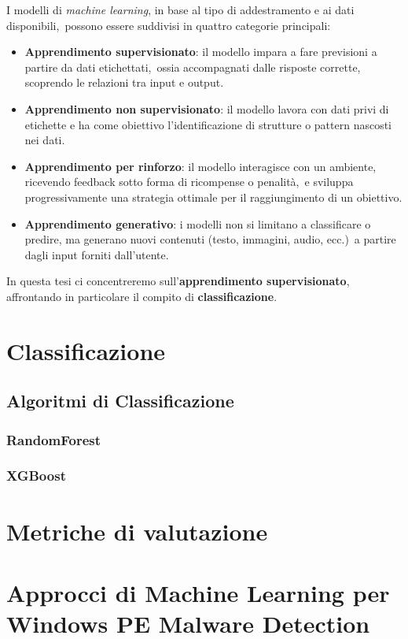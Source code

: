 I modelli di \textit{machine learning}, in base al tipo di addestramento e ai dati disponibili,\
possono essere suddivisi in quattro categorie principali:

\begin{itemize}
      \item \textbf{Apprendimento supervisionato}: il modello impara a fare previsioni a partire da dati etichettati,\
            ossia accompagnati dalle risposte corrette, scoprendo le relazioni tra input e output.
      \item \textbf{Apprendimento non supervisionato}: il modello lavora con dati privi di etichette e ha come obiettivo l'identificazione di strutture o pattern nascosti nei dati.
      \item \textbf{Apprendimento per rinforzo}: il modello interagisce con un ambiente, ricevendo feedback sotto forma di ricompense o penalità,\
            e sviluppa progressivamente una strategia ottimale per il raggiungimento di un obiettivo.
      \item \textbf{Apprendimento generativo}: i modelli non si limitano a classificare o predire, ma generano nuovi contenuti (testo, immagini, audio, ecc.)\
            a partire dagli input forniti dall'utente.
\end{itemize}

In questa tesi ci concentreremo sull'\textbf{apprendimento supervisionato}, affrontando in particolare il compito di \textbf{classificazione}.

\section{Classificazione}


\subsection{Algoritmi di Classificazione}

\subsubsection{RandomForest}

\subsubsection{XGBoost}

\section{Metriche di valutazione}

\section{Approcci di Machine Learning per Windows PE Malware Detection}
